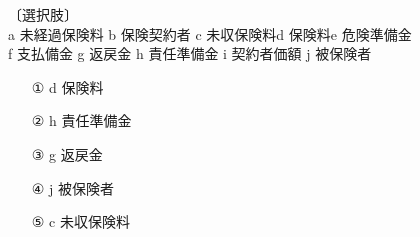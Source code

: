 \documentclass[report,gutter=10mm,fore-edge=10mm,uplatex,dvipdfmx]{jlreq}
\begin{document}
〔選択肢〕\\
a 未経過保険料 b 保険契約者 c 未収保険料d 保険料e 危険準備金\\
f 支払備金 g 返戻金 h 責任準備金 i 契約者価額 j 被保険者
\answer{}

\begin{itemize}
\item[ ① ] d 保険料
\item[ ② ] h 責任準備金
\item[ ③ ] g 返戻金
\item[ ④ ]  j 被保険者
\item[ ⑤ ] c 未収保険料
\end{itemize}
\end{document}
